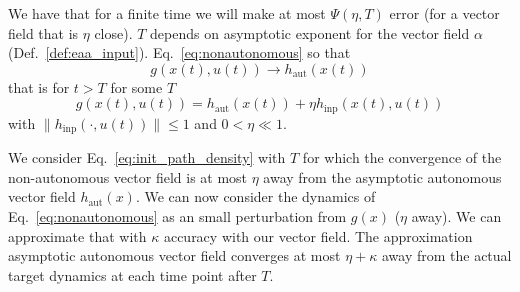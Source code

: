 \documentclass{article}
\theoremstyle{definition} \newtheorem{definition}{Definition}
\theoremstyle{remark} \newtheorem{remark}{Remark}
\newcounter{ct}
\begin{document}
We have that for a finite time we will make at most $\Psi(\eta,T)$ error (for a vector field that is $\eta$ close). $T$ depends on asymptotic exponent for the vector field $\alpha$ (Def.~\ref{def:eaa_input}). %
Eq.~\ref{eq:nonautonomous} so that 
\begin{equation}\label{eq:inputdriven_asymp}
g(x(t), u(t)) \rightarrow h_{\operatorname{aut}}(x(t))
\end{equation}
that is for $t>T$ for some $T$ %
\begin{equation}\label{eq:inputdriven_asymp}
g(x(t), u(t)) =  h_{\operatorname{aut}}(x(t)) + \eta h_{\operatorname{inp}}(x(t), u(t))
\end{equation}
with $\|h_{\operatorname{inp}}(\cdot, u(t))\| \leq 1$ and $0<\eta\ll1$.

We consider Eq.~\ref{eq:init_path_density} with $T$ for which the convergence of the non-autonomous vector field is at most $\eta$ away from the asymptotic autonomous vector field $h_{\operatorname{aut}}(x)$. %
We can now consider the dynamics of Eq.~\ref{eq:nonautonomous} as an small perturbation from $g(x)$ ($\eta$ away).
We can approximate that with $\kappa$ accuracy with our vector field.
The approximation asymptotic autonomous vector field converges at most  $\eta+\kappa$ away from the actual target dynamics at each time point after $T$.
\end{document}
